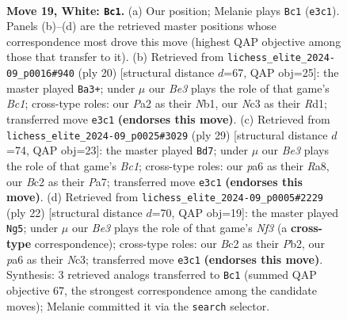 \documentclass[11pt]{article}
\begin{document}
\clearpage

\begin{figure}[p]\centering
\begin{subfigure}{0.46\textwidth}\centering
\resizebox{\linewidth}{!}{%
\newchessgame
\chessboard[
  setfen={rn3r1b/1ppb1k2/p4pp1/4p2p/2P1P3/2N1BN2/PPB2PP1/R3K1R1 w - - 0 19},
  showmover=false,
  pgfstyle=straightmove, color=movearrow, markmove={e3-c1}
]}
\caption{}
\end{subfigure}\hfill
\begin{subfigure}{0.46\textwidth}\centering
\resizebox{\linewidth}{!}{%
\newchessgame
\chessboard[
  setfen={rnb4r/ppp1knbp/5pp1/4p3/4P3/1P3N2/P1P1BPPP/RNBR2K1 w - - 1 11},
  showmover=false,
  pgfstyle=straightmove, color=movearrow, markmove={c1-a3}
]}
\caption{}
\end{subfigure}
\\[4pt]
\begin{subfigure}{0.46\textwidth}\centering
\resizebox{\linewidth}{!}{%
\newchessgame
\chessboard[
  setfen={r1b1r1k1/ppp2pp1/2n2n1p/8/P3p3/1PP3N1/2P2PPP/R1B1KB1R b - - 0 15},
  showmover=false,
  pgfstyle=straightmove, color=movearrow, markmove={c8-d7}
]}
\caption{}
\end{subfigure}\hfill
\begin{subfigure}{0.46\textwidth}\centering
\resizebox{\linewidth}{!}{%
\newchessgame
\chessboard[
  setfen={r2k1b1r/p1pbnppp/1pp5/4P3/6P1/2N2N1P/PPP2P2/R1B2RK1 w - - 1 12},
  showmover=false,
  pgfstyle=straightmove, color=movearrow, markmove={f3-g5}
]}
\caption{}
\end{subfigure}
\caption{\textbf{Move 19, White: \texttt{Bc1}.} (a) Our position; Melanie plays \texttt{Bc1} (\texttt{e3c1}). Panels (b)--(d) are the retrieved master positions whose correspondence most drove this move (highest QAP objective among those that transfer to it). (b) Retrieved from \texttt{lichess\_elite\_2024-09\_p0016\#940} (ply 20) [structural distance $d$=67, QAP obj=25]: the master played \texttt{Ba3+}; under $\mu$ our \emph{Be3} plays the role of that game's \emph{Bc1}; cross-type roles: our \emph{P}a2 as their \emph{N}b1, our \emph{N}c3 as their \emph{R}d1; transferred move \texttt{e3c1} \textbf{(endorses this move)}. (c) Retrieved from \texttt{lichess\_elite\_2024-09\_p0025\#3029} (ply 29) [structural distance $d$=74, QAP obj=23]: the master played \texttt{Bd7}; under $\mu$ our \emph{Be3} plays the role of that game's \emph{Bc1}; cross-type roles: our \emph{p}a6 as their \emph{R}a8, our \emph{B}c2 as their \emph{P}a7; transferred move \texttt{e3c1} \textbf{(endorses this move)}. (d) Retrieved from \texttt{lichess\_elite\_2024-09\_p0005\#2229} (ply 22) [structural distance $d$=70, QAP obj=19]: the master played \texttt{Ng5}; under $\mu$ our \emph{Be3} plays the role of that game's \emph{Nf3} (a \textbf{cross-type} correspondence); cross-type roles: our \emph{B}c2 as their \emph{P}b2, our \emph{p}a6 as their \emph{N}c3; transferred move \texttt{e3c1} \textbf{(endorses this move)}. Synthesis: 3 retrieved analogs transferred to \texttt{Bc1} (summed QAP objective 67, the strongest correspondence among the candidate moves); Melanie committed it via the \texttt{search} selector.}
\label{fig:thought-m36}
\end{figure}
\end{document}
